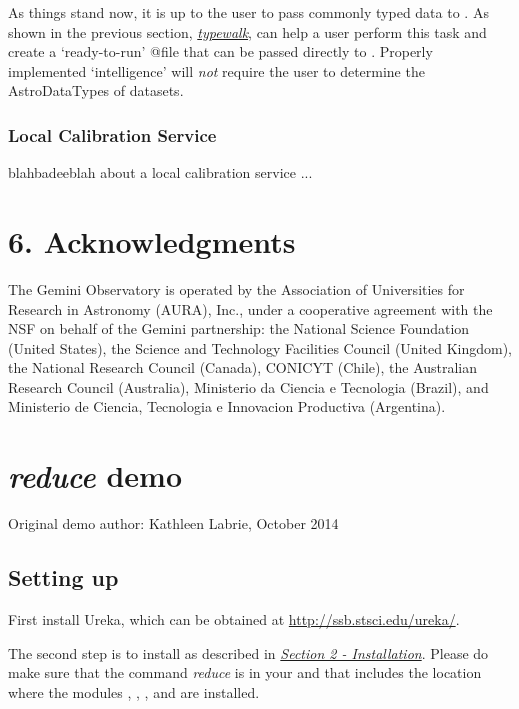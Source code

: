 \documentclass[letterpaper,10pt,english]{sphinxmanual}
\begin{document}
As things stand now, it is up to the user to pass commonly typed data to
. As shown in the previous section, {\hyperref[supptools:typewalk]{\emph{typewalk}}}, 
can help a user perform this task and create a `ready-to-run' @file that can
be passed directly to . Properly implemented `intelligence' will
\emph{not} require the user to determine the AstroDataTypes of datasets.


\subsection{Local Calibration Service}
\label{discuss:local-calibration-service}
blahbadeeblah about a local calibration service ...


\chapter{6. Acknowledgments}
\label{ack::doc}\label{ack:acknowledgments}
The Gemini Observatory is operated by the Association of Universities for
Research in Astronomy (AURA), Inc., under a cooperative agreement with the NSF on
behalf of the Gemini partnership: the National Science Foundation
(United States), the Science and Technology Facilities Council (United Kingdom),
the National Research Council (Canada), CONICYT (Chile), the Australian
Research Council (Australia), Ministerio da Ciencia e Tecnologia (Brazil),
and Ministerio de Ciencia, Tecnologia e Innovacion Productiva (Argentina).
\appendix
\noappendicestocpagenum
\addappheadtotoc

\chapter{\emph{reduce} demo}
\label{appendices/appendix_demo::doc}\label{appendices/appendix_demo:reduce-demo}
Original demo author: Kathleen Labrie, October 2014


\section{Setting up}
\label{appendices/appendix_demo:setting-up}
First install Ureka, which can be obtained at \href{http://ssb.stsci.edu/ureka/}{http://ssb.stsci.edu/ureka/}.

The second step is to install  as described in
{\hyperref[userenv:config]{\emph{Section 2 - Installation}}}.
Please do make sure that the command \emph{reduce} is in your  and that
 includes the location where the modules , ,
, and  are installed.
\end{document}
